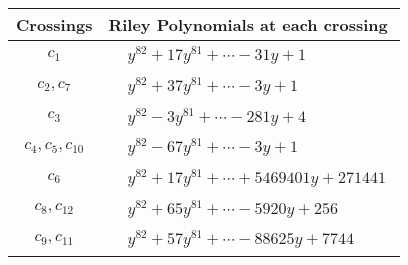 \documentclass[1p]{elsarticle_modified}
\theoremstyle{definition}
\begin{document}
\begin{tabular}{m{50pt}|m{274pt}}
Crossings & \hspace{64pt}Riley Polynomials at each crossing \\
\hline $$\begin{aligned}c_{1}\end{aligned}$$&$\begin{aligned}
&y^{82}+17 y^{81}+\cdots-31 y+1
\end{aligned}$\\
\hline $$\begin{aligned}c_{2},c_{7}\end{aligned}$$&$\begin{aligned}
&y^{82}+37 y^{81}+\cdots-3 y+1
\end{aligned}$\\
\hline $$\begin{aligned}c_{3}\end{aligned}$$&$\begin{aligned}
&y^{82}-3 y^{81}+\cdots-281 y+4
\end{aligned}$\\
\hline $$\begin{aligned}c_{4},c_{5},c_{10}\end{aligned}$$&$\begin{aligned}
&y^{82}-67 y^{81}+\cdots-3 y+1
\end{aligned}$\\
\hline $$\begin{aligned}c_{6}\end{aligned}$$&$\begin{aligned}
&y^{82}+17 y^{81}+\cdots+5469401 y+271441
\end{aligned}$\\
\hline $$\begin{aligned}c_{8},c_{12}\end{aligned}$$&$\begin{aligned}
&y^{82}+65 y^{81}+\cdots-5920 y+256
\end{aligned}$\\
\hline $$\begin{aligned}c_{9},c_{11}\end{aligned}$$&$\begin{aligned}
&y^{82}+57 y^{81}+\cdots-88625 y+7744
\end{aligned}$\\
\hline
\end{tabular}
\vskip 2pc
\end{document}
